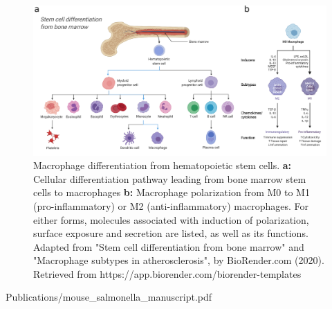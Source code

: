 \begin{figure}[htb]
    \includegraphics[width=\textwidth]{Parts/Part02/gfx/macrophage_differentiation.png}
    \caption[Macrophage differentiation.]{Macrophage differentiation from hematopoietic stem cells. \textbf{a:} Cellular differentiation pathway leading from bone marrow stem cells to macrophages \textbf{b:} Macrophage polarization from M0 to M1 (pro-inflammatory) or M2 (anti-inflammatory) macrophages. For either forms, molecules associated with induction of polarization, surface exposure and secretion are listed, as well as its functions. Adapted from "Stem cell differentiation from bone marrow" and "Macrophage subtypes in atherosclerosis", by BioRender.com (2020). Retrieved from https://app.biorender.com/biorender-templates}
    \label{fig:02-03:macrophage}
\end{figure}



     {Publications/mouse_salmonella_manuscript.pdf}    